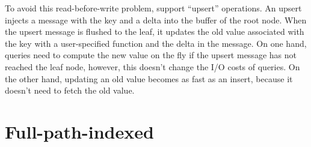 To avoid this read-before-write problem, \bets support ``upsert'' operations.
An upsert injects a message with the key and a delta into the buffer of the root
node.
When the upsert message is flushed to the leaf, it updates the old value
associated with the key with a user-specified function and the delta in the
message.
On one hand, queries need to compute the new value on the fly if the upsert
message has not reached the leaf node,
however, this doesn't change the I/O costs of queries.
On the other hand, updating an old value becomes as fast as an insert,
because it doesn't need to fetch the old value.

\section{Full-path-indexed \betrfs}
\label{sec:fpi}


